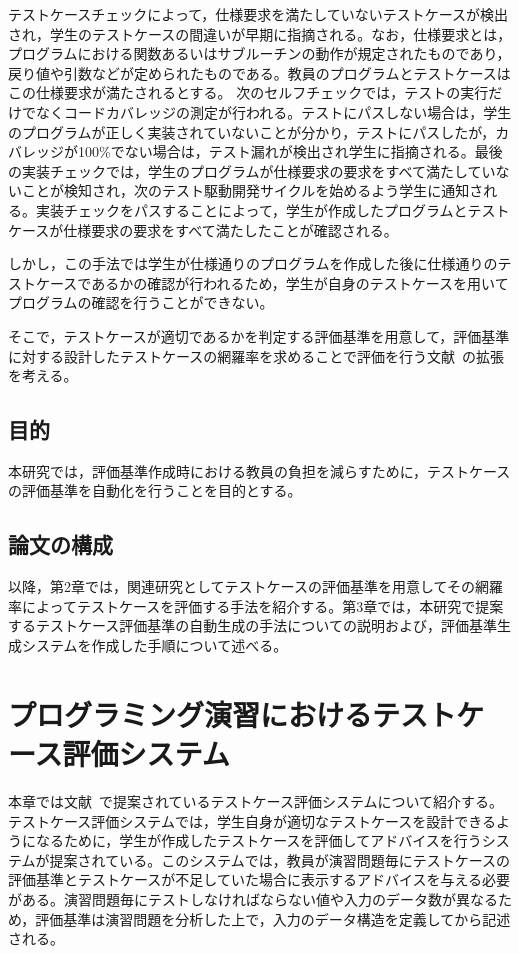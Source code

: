 \documentclass{tpu-sotu}
\begin{document}
テストケースチェックによって，仕様要求を満たしていないテストケースが検出され，学生のテストケースの間違いが早期に指摘される。なお，仕様要求とは，プログラムにおける関数あるいはサブルーチンの動作が規定されたものであり，戻り値や引数などが定められたものである。教員のプログラムとテストケースはこの仕様要求が満たされるとする。
次のセルフチェックでは，テストの実行だけでなくコードカバレッジの測定が行われる。テストにパスしない場合は，学生のプログラムが正しく実装されていないことが分かり，テストにパスしたが，カバレッジが100\%でない場合は，テスト漏れが検出され学生に指摘される。最後の実装チェックでは，学生のプログラムが仕様要求の要求をすべて満たしていないことが検知され，次のテスト駆動開発サイクルを始めるよう学生に通知される。実装チェックをパスすることによって，学生が作成したプログラムとテストケースが仕様要求の要求をすべて満たしたことが確認される。

しかし，この手法では学生が仕様通りのプログラムを作成した後に仕様通りのテストケースであるかの確認が行われるため，学生が自身のテストケースを用いてプログラムの確認を行うことができない。

そこで，テストケースが適切であるかを判定する評価基準を用意して，評価基準に対する設計したテストケースの網羅率を求めることで評価を行う文献~\cite{a1}の拡張を考える。
\section{目的}
本研究では，評価基準作成時における教員の負担を減らすために，テストケースの評価基準を自動化を行うことを目的とする。
\section{論文の構成}
以降，第2章では，関連研究としてテストケースの評価基準を用意してその網羅率によってテストケースを評価する手法を紹介する。第3章では，本研究で提案するテストケース評価基準の自動生成の手法についての説明および，評価基準生成システムを作成した手順について述べる。
\chapter{プログラミング演習におけるテストケース評価システム}
本章では文献~\cite{a1}で提案されているテストケース評価システムについて紹介する。テストケース評価システムでは，学生自身が適切なテストケースを設計できるようになるために，学生が作成したテストケースを評価してアドバイスを行うシステムが提案されている。このシステムでは，教員が演習問題毎にテストケースの評価基準とテストケースが不足していた場合に表示するアドバイスを与える必要がある。演習問題毎にテストしなければならない値や入力のデータ数が異なるため，評価基準は演習問題を分析した上で，入力のデータ構造を定義してから記述される。
\end{document}
